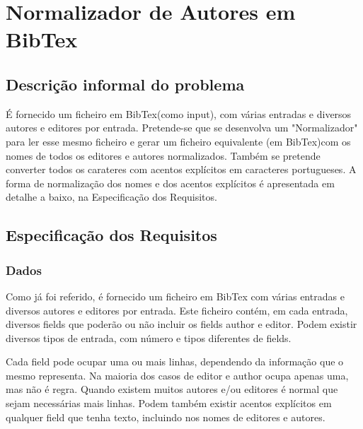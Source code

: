 \documentclass{report}
\begin{document}
\section{Normalizador de Autores em BibTex}

\subsection{Descrição informal do problema}
É fornecido um ficheiro em BibTex(como input), com várias entradas e diversos autores e editores por entrada.
Pretende-se que se desenvolva um "Normalizador" para ler esse mesmo ficheiro e gerar um ficheiro equivalente
(em BibTex)com os nomes de todos os editores e autores normalizados. Também se pretende converter todos os carateres com acentos explícitos em caracteres portugueses.
A forma de normalização dos nomes e dos acentos explícitos é apresentada em detalhe a baixo, na Especificação dos Requisitos.
\subsection{Especificação dos Requisitos}
\subsubsection{Dados}
Como já foi referido, é fornecido um ficheiro em BibTex com várias entradas e diversos autores e editores por entrada. Este ficheiro contém, em cada entrada, diversos fields que poderão ou não incluir os fields author e editor. Podem existir
diversos tipos de entrada, com número e tipos diferentes de fields.\par
Cada field pode ocupar uma ou mais linhas, dependendo da informação que o mesmo representa. Na maioria dos casos de editor
e author ocupa apenas uma, mas não é regra. Quando existem muitos autores e/ou editores é normal que sejam
necessárias mais linhas. Podem também existir acentos explícitos em qualquer field que tenha texto, incluindo nos nomes
de editores e autores.
\end{document}
